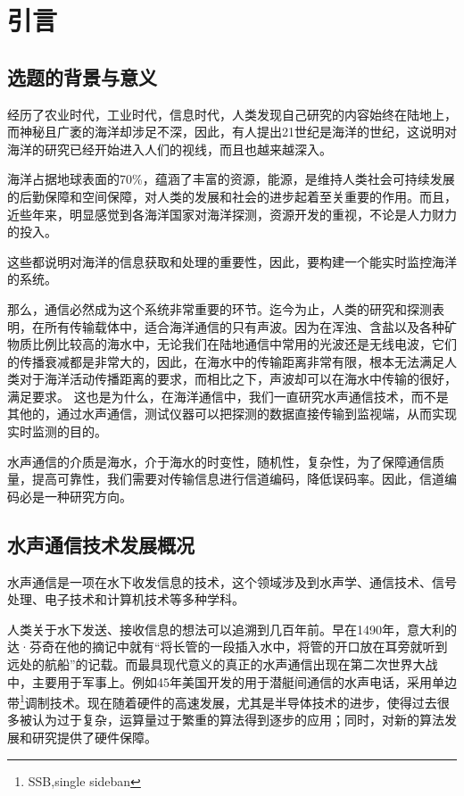 ﻿%
%
\chapter{引言}
\thispagestyle{empty}
\section{选题的背景与意义}
经历了农业时代，工业时代，信息时代，人类发现自己研究的内容始终在陆地上，而神秘且广袤的海洋却涉足不深，因此，有人提出21世纪是海洋的世纪，这说明对海洋的研究已经开始进入人们的视线，而且也越来越深入。

海洋占据地球表面的70\%，蕴涵了丰富的资源，能源，是维持人类社会可持续发展的后勤保障和空间保障，对人类的发展和社会的进步起着至关重要的作用。而且，近些年来，明显感觉到各海洋国家对海洋探测，资源开发的重视，不论是人力财力的投入。

这些都说明对海洋的信息获取和处理的重要性，因此，要构建一个能实时监控海洋的系统。

那么，通信必然成为这个系统非常重要的环节。迄今为止，人类的研究和探测表明，在所有传输载体中，适合海洋通信的只有声波。因为在浑浊、含盐以及各种矿物质比例比较高的海水中，无论我们在陆地通信中常用的光波还是无线电波，它们的传播衰减都是非常大的，因此，在海水中的传输距离非常有限，根本无法满足人类对于海洋活动传播距离的要求，而相比之下，声波却可以在海水中传输的很好，满足要求。
这也是为什么，在海洋通信中，我们一直研究水声通信技术，而不是其他的，通过水声通信，测试仪器可以把探测的数据直接传输到监视端，从而实现实时监测的目的。

水声通信的介质是海水，介于海水的时变性，随机性，复杂性，为了保障通信质量，提高可靠性，我们需要对传输信息进行信道编码，降低误码率。因此，信道编码必是一种研究方向。
\section{水声通信技术发展概况}
水声通信是一项在水下收发信息的技术，这个领域涉及到水声学、通信技术、信号处理、电子技术和计算机技术等多种学科。

人类关于水下发送、接收信息的想法可以追溯到几百年前。早在1490年，意大利的达·芬奇在他的摘记中就有“将长管的一段插入水中，将管的开口放在耳旁就听到远处的航船”的记载。而最具现代意义的真正的水声通信出现在第二次世界大战中，主要用于军事上。例如45年美国开发的用于潜艇间通信的水声电话，采用单边带\footnote{SSB,single sideban
}调制技术。现在随着硬件的高速发展，尤其是半导体技术的进步，使得过去很多被认为过于复杂，运算量过于繁重的算法得到逐步的应用；同时，对新的算法发展和研究提供了硬件保障。


